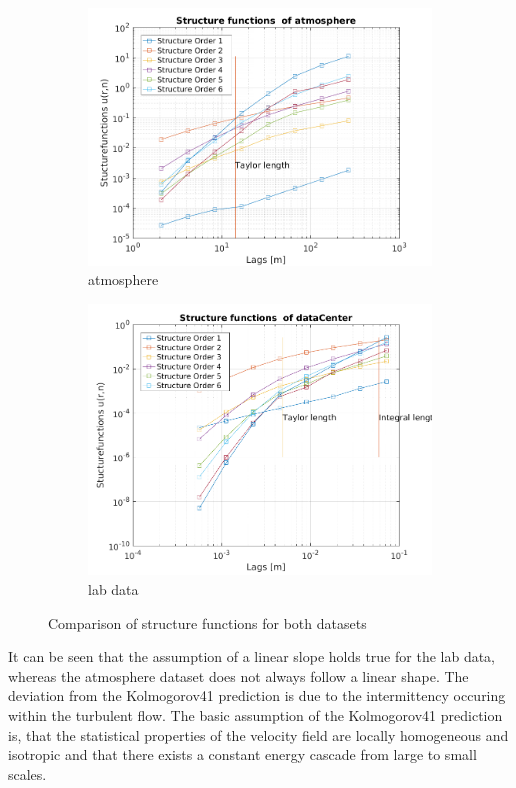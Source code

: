 \documentclass[12pt]{article}
\begin{document}
\begin{figure}[H]
\begin{subfigure}{0.5\textwidth}
  \centering
  \includegraphics[width=1\linewidth]{figures/structure_atmo.png}
  \caption{atmosphere}
\end{subfigure}
\begin{subfigure}{0.5\textwidth}
  \centering
  \includegraphics[width=1\linewidth]{figures/structure_center.png}
  \caption{lab data}
\end{subfigure}
\caption{Comparison of structure functions for both datasets}
\label{fig:comparison_pdf_incr_normed}
\end{figure}
It can be seen that the assumption of a linear slope holds true for the lab data, whereas the atmosphere dataset does not always follow a linear shape. The deviation from the Kolmogorov41 prediction is due to the intermittency occuring within the turbulent flow. The basic assumption of the Kolmogorov41 prediction is, that the statistical properties of the velocity field are locally homogeneous and isotropic and that there exists a constant energy cascade from large to small scales. \cite{benzi}
\end{document}
